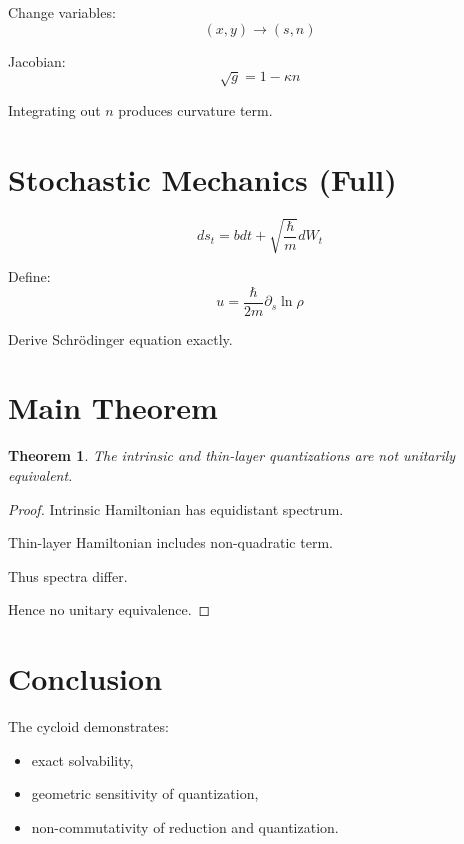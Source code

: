 \documentclass[11pt]{article}
\newtheorem{theorem}{Theorem}
\begin{document}
Change variables:
\[
(x,y) \to (s,n)
\]

Jacobian:
\[
\sqrt{g} = 1-\kappa n
\]

Integrating out $n$ produces curvature term.

\section{Stochastic Mechanics (Full)}

\[
ds_t = b dt + \sqrt{\frac{\hbar}{m}} dW_t
\]

Define:
\[
u = \frac{\hbar}{2m}\partial_s \ln \rho
\]

Derive Schrödinger equation exactly.

\section{Main Theorem}

\begin{theorem}
The intrinsic and thin-layer quantizations are not unitarily equivalent.
\end{theorem}

\begin{proof}
Intrinsic Hamiltonian has equidistant spectrum.

Thin-layer Hamiltonian includes non-quadratic term.

Thus spectra differ.

Hence no unitary equivalence.
\end{proof}

\section{Conclusion}

The cycloid demonstrates:
\begin{itemize}
\item exact solvability,
\item geometric sensitivity of quantization,
\item non-commutativity of reduction and quantization.
\end{itemize}
\end{document}
